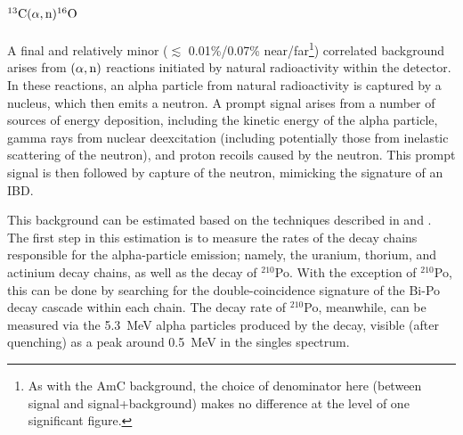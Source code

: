 \documentclass[../thesis.tex]{subfiles}
\begin{document}
\begin{table}[ht]
  \caption{AmC background rates for the P17B data set \cite{lianghongBkg}.}
  \label{tab:bkgAmcDailyRates}
\end{table}


\section{$^{13}\mathrm{C}(\alpha, \mathrm{n})^{16}\mathrm{O}$}
\label{sec:bkgCanOOverview}

A final and relatively minor ($\lesssim$ 0.01\%/0.07\% near/far\footnote{As with the AmC background, the choice of denominator here (between signal and signal+background) makes no difference at the level of one significant figure.}) correlated background arises from $(\alpha,\mathrm{n})$ reactions initiated by natural radioactivity within the detector. In these reactions, an alpha particle from natural radioactivity is captured by a nucleus, which then emits a neutron. A prompt signal arises from a number of sources of energy deposition, including the kinetic energy of the alpha particle, gamma rays from nuclear deexcitation (including potentially those from inelastic scattering of the neutron), and proton recoils caused by the neutron. This prompt signal is then followed by capture of the neutron, mimicking the signature of an IBD.

This background can be estimated based on the techniques described in \cite{Zhao_2014} and \cite{An_2017}. The first step in this estimation is to measure the rates of the decay chains responsible for the alpha-particle emission; namely, the uranium, thorium, and actinium decay chains, as well as the decay of $^{210}$Po. With the exception of $^{210}$Po, this can be done by searching for the double-coincidence signature of the Bi-Po decay cascade within each chain. The decay rate of $^{210}$Po, meanwhile, can be measured via the 5.3~MeV alpha particles produced by the decay, visible (after quenching) as a peak around 0.5~MeV in the singles spectrum.
\end{document}
